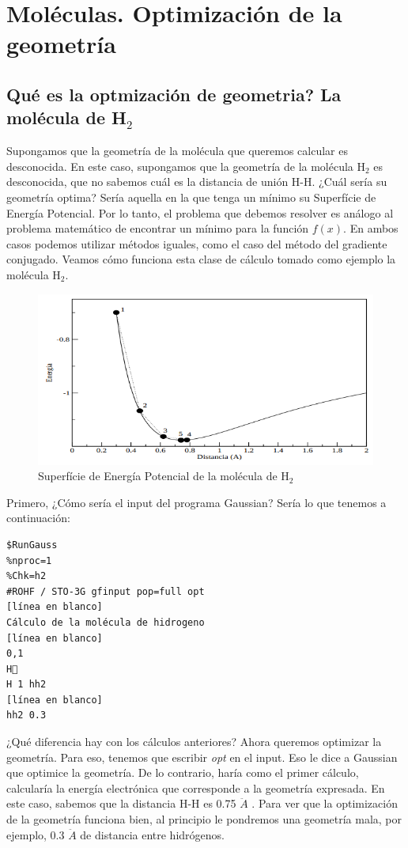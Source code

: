 \documentclass{tufte-book}
\begin{document}
\chapter{Moléculas. Optimización de la geometría}

\section{Qué es la optmización de geometria? La molécula de H$_2$}

Supongamos que la geometría de la molécula que queremos calcular es desconocida. 
En este caso, supongamos que la geometría de la molécula H$_2$  es desconocida, 
que no sabemos cuál es la distancia de unión H-H. ¿Cuál sería su geometría optima? 
Sería aquella en la que tenga un mínimo su Superfície de Energía Potencial. 
Por lo tanto, el problema que debemos resolver es análogo al problema matemático
de encontrar un mínimo para la función $f(x)$. En ambos casos podemos utilizar 
métodos iguales, como el caso del método del gradiente conjugado. Veamos cómo
funciona esta clase de cálculo tomado como ejemplo la molécula H$_2$.

\begin{figure}
\centering
\includegraphics[scale=0.7]{PES_opt_H2.png}
\caption{Superfície de Energía Potencial de la molécula de H$_2$ }
\end{figure}

Primero, ¿Cómo sería el input del programa Gaussian? Sería lo que tenemos a continuación:

\begin{verbatim}
$RunGauss
%nproc=1
%Chk=h2
#ROHF / STO-3G gfinput pop=full opt
[línea en blanco]
Cálculo de la molécula de hidrogeno 
[línea en blanco] 
0,1
H
H 1 hh2
[línea en blanco]
hh2 0.3
\end{verbatim}

¿Qué diferencia hay con los cálculos anteriores? Ahora queremos optimizar la geometría. Para eso, tenemos que escribir \textit{opt} en el input. Eso le dice a Gaussian que optimice la geometría. De lo contrario, haría como el primer cálculo, calcularía la energía electrónica que corresponde a la geometría expresada. En este caso, sabemos que la distancia H-H es 0.75 $\ddot{A}$ . Para ver que la optimización de la geometría funciona bien, al principio le pondremos una geometría mala, por ejemplo, 0.3 $\ddot{A}$ de distancia entre hidrógenos. 
\end{document}
